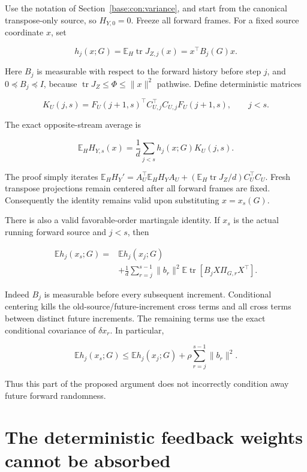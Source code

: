 \documentclass[11pt,oneside,openany,a4paper]{book}
\numberwithin{equation}{chapter}
\theoremstyle{definition}
\theoremstyle{remark}
\begin{document}
Use the notation of Section~\ref{base:con:variance}, and start from the canonical transpose-only source, so \(H_{Y,0}=0\). Freeze all forward frames. For a fixed source coordinate \(x\), set

\[
h_j(x;G)=\mathbb E_H\operatorname{tr}J_{Z,j}(x)
=x^{\top}B_j(G)x.
\]

Here \(B_j\) is measurable with respect to the forward history before step \(j\), and \(0\preceq B_j\preceq I\), because \(\operatorname{tr}J_Z\le\Phi\le\|x\|^2\) pathwise. Define deterministic matrices

\[
K_U(j,s)=F_U(j+1,s)^{\top}C_{U,j}^{\top}C_{U,j}F_U(j+1,s),
\qquad j<s.
\]

The exact opposite-stream average is

\[
\boxed{
\mathbb E_H H_{Y,s}(x)
=\frac1d\sum_{j<s}h_j(x;G)K_U(j,s).}
\]

The proof simply iterates \(\mathbb E_HH_Y'=A_U^{\top}\mathbb E_HH_YA_U+
(\mathbb E_H\operatorname{tr}J_Z/d)C_U^{\top}C_U\). Fresh transpose projections remain centered after all forward frames are fixed. Consequently the identity remains valid upon substituting \(x=x_s(G)\).

There is also a valid favorable-order martingale identity. If \(x_s\) is the actual running forward source and \(j<s\), then

\[
\boxed{
\begin{aligned}
\mathbb E h_j(x_s;G)
={}&\mathbb E h_j(x_j;G)\\
&+\frac1d\sum_{r=j}^{s-1}\|b_r\|^2
\mathbb E\operatorname{tr}\!\left[B_jX\Pi_{G,r}X^{\top}\right].
\end{aligned}}
\]

Indeed \(B_j\) is measurable before every subsequent increment. Conditional centering kills the old-source/future-increment cross terms and all cross terms between distinct future increments. The remaining terms use the exact conditional covariance of \(\delta x_r\). In particular,

\[
\mathbb E h_j(x_s;G)
\le\mathbb E h_j(x_j;G)+\rho\sum_{r=j}^{s-1}\|b_r\|^2.
\]

Thus this part of the proposed argument does not incorrectly condition away future forward randomness.

\section{The deterministic feedback weights cannot be absorbed}\label{rowmajorant:the-deterministic-feedback-weights-cannot-be-absorbed}
\end{document}
